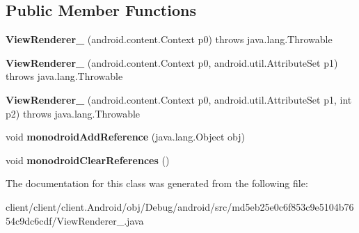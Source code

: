 \subsection*{Public Member Functions}
\begin{DoxyCompactItemize}
\item 
\hypertarget{classmd5eb25e0c6f853c9e5104b7654c9dc6cdf_1_1ViewRenderer__2_ac1471479568c282f1a4574dbc3e68171}{}{\bfseries View\+Renderer\+\_} (android.\+content.\+Context p0)  throws java.\+lang.\+Throwable 	\label{classmd5eb25e0c6f853c9e5104b7654c9dc6cdf_1_1ViewRenderer__2_ac1471479568c282f1a4574dbc3e68171}

\item 
\hypertarget{classmd5eb25e0c6f853c9e5104b7654c9dc6cdf_1_1ViewRenderer__2_ab3921a50a313ef8806837f23026a8868}{}{\bfseries View\+Renderer\+\_} (android.\+content.\+Context p0, android.\+util.\+Attribute\+Set p1)  throws java.\+lang.\+Throwable 	\label{classmd5eb25e0c6f853c9e5104b7654c9dc6cdf_1_1ViewRenderer__2_ab3921a50a313ef8806837f23026a8868}

\item 
\hypertarget{classmd5eb25e0c6f853c9e5104b7654c9dc6cdf_1_1ViewRenderer__2_ae2824addfe881ee33276c767e1cf4cf7}{}{\bfseries View\+Renderer\+\_} (android.\+content.\+Context p0, android.\+util.\+Attribute\+Set p1, int p2)  throws java.\+lang.\+Throwable 	\label{classmd5eb25e0c6f853c9e5104b7654c9dc6cdf_1_1ViewRenderer__2_ae2824addfe881ee33276c767e1cf4cf7}

\item 
\hypertarget{classmd5eb25e0c6f853c9e5104b7654c9dc6cdf_1_1ViewRenderer__2_a5144c75b8e19fb31740fbc12f29299e3}{}void {\bfseries monodroid\+Add\+Reference} (java.\+lang.\+Object obj)\label{classmd5eb25e0c6f853c9e5104b7654c9dc6cdf_1_1ViewRenderer__2_a5144c75b8e19fb31740fbc12f29299e3}

\item 
\hypertarget{classmd5eb25e0c6f853c9e5104b7654c9dc6cdf_1_1ViewRenderer__2_a6ca7055a861a11c21eab80b9bcfaba7d}{}void {\bfseries monodroid\+Clear\+References} ()\label{classmd5eb25e0c6f853c9e5104b7654c9dc6cdf_1_1ViewRenderer__2_a6ca7055a861a11c21eab80b9bcfaba7d}

\end{DoxyCompactItemize}


The documentation for this class was generated from the following file\+:\begin{DoxyCompactItemize}
\item 
client/client/client.\+Android/obj/\+Debug/android/src/md5eb25e0c6f853c9e5104b7654c9dc6cdf/View\+Renderer\+\_.\+java\end{DoxyCompactItemize}
